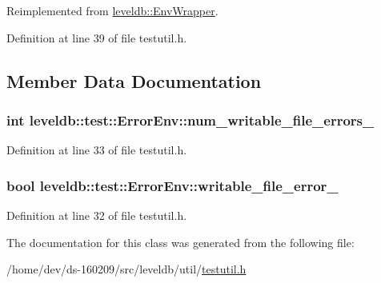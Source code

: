 Reimplemented from \hyperlink{classleveldb_1_1_env_wrapper_a2d2b29a658e80c326ddaeb9c4d74c483}{leveldb\+::\+Env\+Wrapper}.



Definition at line 39 of file testutil.\+h.



\subsection{Member Data Documentation}
\hypertarget{classleveldb_1_1test_1_1_error_env_afa4564355d86107c8ed0d6efe53eadef}{}
\subsubsection[{num\+\_\+writable\+\_\+file\+\_\+errors\+\_\+}]{\setlength{\rightskip}{0pt plus 5cm}int leveldb\+::test\+::\+Error\+Env\+::num\+\_\+writable\+\_\+file\+\_\+errors\+\_\+}\label{classleveldb_1_1test_1_1_error_env_afa4564355d86107c8ed0d6efe53eadef}


Definition at line 33 of file testutil.\+h.

\hypertarget{classleveldb_1_1test_1_1_error_env_ae3593b752dff671f24f3637376e1cf22}{}
\subsubsection[{writable\+\_\+file\+\_\+error\+\_\+}]{\setlength{\rightskip}{0pt plus 5cm}bool leveldb\+::test\+::\+Error\+Env\+::writable\+\_\+file\+\_\+error\+\_\+}\label{classleveldb_1_1test_1_1_error_env_ae3593b752dff671f24f3637376e1cf22}


Definition at line 32 of file testutil.\+h.



The documentation for this class was generated from the following file\+:\begin{DoxyCompactItemize}
\item 
/home/dev/ds-\/160209/src/leveldb/util/\hyperlink{testutil_8h}{testutil.\+h}\end{DoxyCompactItemize}
